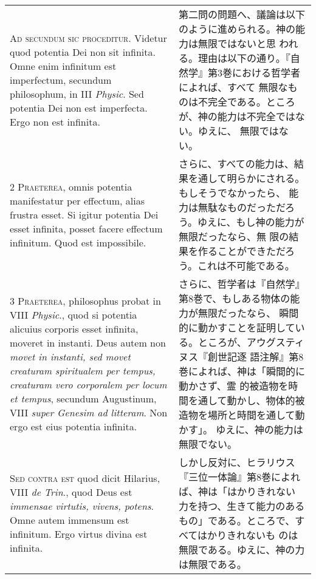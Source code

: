 \documentclass[10pt]{jsarticle} %
\begin{document}
\begin{longtable}{p{21em}p{21em}}

{\Huge A}{\scshape d secundum sic proceditur}. Videtur quod potentia Dei
 non sit infinita. Omne enim infinitum est imperfectum, secundum
 philosophum, in III {\itshape Physic}. Sed potentia Dei non est imperfecta. Ergo
 non est infinita.

&

第二問の問題へ、議論は以下のように進められる。神の能力は無限ではないと思
 われる。理由は以下の通り。『自然学』第3巻における哲学者によれば、すべて
 無限なものは不完全である。ところが、神の能力は不完全ではない。ゆえに、
 無限ではない。


\\


{\scshape 2 Praeterea}, omnis potentia manifestatur per effectum, alias
 frustra esset. Si igitur potentia Dei esset infinita, posset facere
 effectum infinitum. Quod est impossibile.


&

さらに、すべての能力は、結果を通して明らかにされる。もしそうでなかったら、
 能力は無駄なものだっただろう。ゆえに、もし神の能力が無限だったなら、無
 限の結果を作ることができただろう。これは不可能である。


\\


{\scshape 3 Praeterea}, philosophus probat in VIII {\itshape Physic}.,
 quod si potentia alicuius corporis esset infinita, moveret in
 instanti. Deus autem non {\itshape movet in instanti, sed movet creaturam
 spiritualem per tempus, creaturam vero corporalem per locum et tempus},
 secundum Augustinum, VIII {\itshape super Genesim ad litteram}. Non ergo est eius
 potentia infinita.


&

さらに、哲学者は『自然学』第8巻で、もしある物体の能力が無限だったなら、
 瞬間的に動かすことを証明している。ところが、アウグスティヌス『創世記逐
 語注解』第8巻によれば、神は「瞬間的に動かさず、霊
 的被造物を時間を通して動かし、物体的被造物を場所と時間を通して動かす」。
 ゆえに、神の能力は無限でない。


\\


{\scshape Sed contra est} quod dicit Hilarius, VIII {\itshape de Trin}.,
 quod Deus est {\itshape immensae virtutis, vivens, potens}. Omne autem
 immensum est infinitum. Ergo virtus divina est infinita.


&

しかし反対に、ヒラリウス『三位一体論』第8巻によれば、神は「はかりきれない
 力を持つ、生きて能力のあるもの」である。ところで、すべてはかりきれないも
 のは無限である。ゆえに、神の力は無限である。


\end{longtable}
\end{document}
